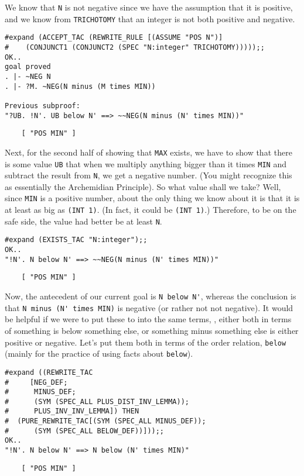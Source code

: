 We know that {\small\tt N} is not negative since we have the
assumption that it is positive, and we know from
{\small\verb+TRICHOTOMY+} that an integer is not both positive and
negative.
\begin{session}
\begin{verbatim}
#expand (ACCEPT_TAC (REWRITE_RULE [(ASSUME "POS N")]
#    (CONJUNCT1 (CONJUNCT2 (SPEC "N:integer" TRICHOTOMY)))));;
OK..
goal proved
. |- ~NEG N
. |- ?M. ~NEG(N minus (M times MIN))

Previous subproof:
"?UB. !N'. UB below N' ==> ~~NEG(N minus (N' times MIN))"
\end{verbatim}
\mvdots
\begin{verbatim}
    [ "POS MIN" ]
\end{verbatim}
\evdots
\end{session}

Next, for the second half of showing that {\small\verb+MAX+} exists,
we have to show that there is some value {\small\verb+UB+} that when
we multiply anything bigger than it times {\small\verb+MIN+} and
subtract the result from {\small\tt N}, we get a negative number.
(You might recognize this as essentially the Archemidian Principle).
So what value shall we take?  Well, since {\small\verb+MIN+} is a
positive number, about the only thing we know about it is that it is
at least as big as {\small\verb+(INT 1)+}.  (In fact, it could be
{\small\verb+(INT 1)+}.)  Therefore, to be on the safe side, the value
had better be at least {\small\tt N}.
\begin{session}
\begin{verbatim}
#expand (EXISTS_TAC "N:integer");;
OK..
"!N'. N below N' ==> ~~NEG(N minus (N' times MIN))"
\end{verbatim}
\mvdots
\begin{verbatim}
    [ "POS MIN" ]
\end{verbatim}
\evdots
\end{session}

Now, the antecedent of our current goal is {\small\verb+N below N'+},
whereas the conclusion is that {\small\verb+N minus (N' times MIN)+}
is negative (or rather not not negative).  It would be helpful if we
were to put these to into the same terms, \ie, either both in terms of
something is below something else, or something minus something else
is either positive or negative.  Let's put them both in terms of the
order relation, {\small\verb+below+} (mainly for the practice of using
facts about {\small\verb+below+}). 
\begin{session}
\begin{verbatim}
#expand ((REWRITE_TAC
#     [NEG_DEF;
#      MINUS_DEF;
#      (SYM (SPEC_ALL PLUS_DIST_INV_LEMMA));
#      PLUS_INV_INV_LEMMA]) THEN
#  (PURE_REWRITE_TAC[(SYM (SPEC_ALL MINUS_DEF));
#      (SYM (SPEC_ALL BELOW_DEF))]));;
OK..
"!N'. N below N' ==> N below (N' times MIN)"
\end{verbatim}
\mvdots
\begin{verbatim}
    [ "POS MIN" ]
\end{verbatim}
\evdots
\end{session}

